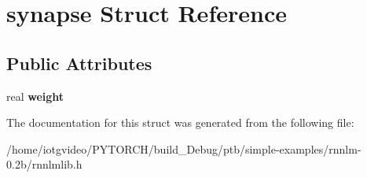 \hypertarget{structsynapse}{}\section{synapse Struct Reference}
\label{structsynapse}
\subsection*{Public Attributes}
\begin{DoxyCompactItemize}
\item 
\mbox{\label{structsynapse_ad998e3353c0f4fbc7b477cd49df4b906}} 
real {\bfseries weight}
\end{DoxyCompactItemize}


The documentation for this struct was generated from the following file\+:\begin{DoxyCompactItemize}
\item 
/home/iotgvideo/\+P\+Y\+T\+O\+R\+C\+H/build\+\_\+\+Debug/ptb/simple-\/examples/rnnlm-\/0.\+2b/rnnlmlib.\+h\end{DoxyCompactItemize}
